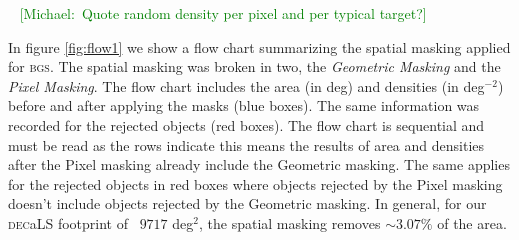 \documentclass[fleqn,usenatbib]{mnras}
\newcommand{\mike}[1]{~\newline\noindent \textcolor{Green}{{ [Michael:~{#1}]\\}}}
\newcommand{\BGS}{\textsc{bgs}\xspace}
\newcommand{\DECaLS}{\textsc{dec}a\textsc{LS}\xspace}
\begin{document}
\mike{Quote random density per pixel and per typical target?}
 
In figure \ref{fig:flow1} we show a flow chart summarizing the spatial masking applied for \BGS. The spatial masking was broken in two, the {\it Geometric Masking} and the {\it Pixel Masking}. The flow chart includes the area (in deg) and densities (in deg$^{-2}$) before and after applying the masks (blue boxes). The same information was recorded for the rejected objects (red boxes). The flow chart is sequential and must be read as the rows indicate this means the results of area and densities after the Pixel masking already include the Geometric masking. The same applies for the rejected objects in red boxes where objects rejected by the Pixel masking doesn't include objects rejected by the Geometric masking. In general, for our \DECaLS footprint of ~$9717$ deg$^2$, the spatial masking removes $\sim 3.07 \% $ of the area.
\end{document}
